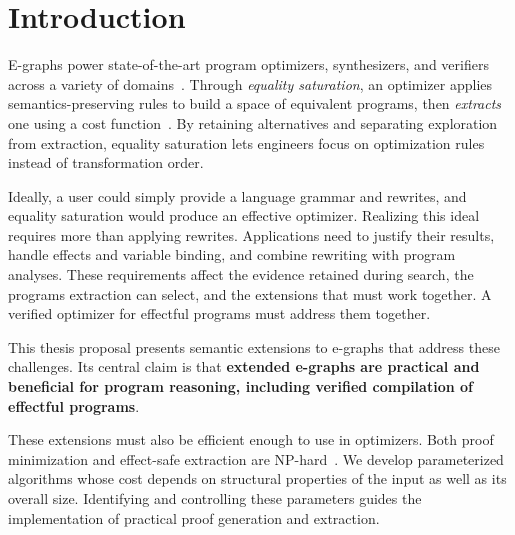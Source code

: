 \section{Introduction}
\label{sec:introduction}

E-graphs power state-of-the-art program optimizers, synthesizers, and verifiers
  across a variety of domains~\cite{egg,szalinski,caviar}.
Through \emph{equality saturation}, an optimizer applies semantics-preserving rules
  to build a space of equivalent programs, then \emph{extracts} one using a cost function~\cite{peggy}.
By retaining alternatives and separating exploration from extraction, equality saturation
  lets engineers focus on optimization rules instead of transformation order.

Ideally, a user could simply provide a language grammar and rewrites,
  and equality saturation would produce an effective optimizer.
Realizing this ideal requires more than applying rewrites.
Applications need to justify their results, handle effects and variable binding,
  and combine rewriting with program analyses.
These requirements affect the evidence retained during search,
  the programs extraction can select, and the extensions that must work together.
A verified optimizer for effectful programs must address them together.

This thesis proposal presents semantic extensions to e-graphs that address these challenges.
Its central claim is that \textbf{extended e-graphs are practical and beneficial
  for program reasoning, including verified compilation
  of effectful programs}.

These extensions must also be efficient enough to use in optimizers.
Both proof minimization and effect-safe extraction are NP-hard~\cite{eggproof,eggcc}.
We develop parameterized algorithms whose cost depends on structural properties of the input
  as well as its overall size.
Identifying and controlling these parameters guides the implementation of practical
  proof generation and extraction.


